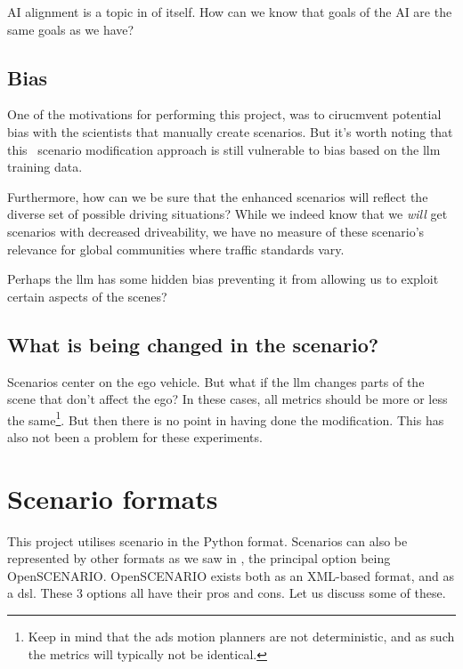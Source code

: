 AI alignment is a topic in of itself. How can we know that goals of the AI are the same goals as we
have?

\subsection{Bias}

One of the motivations for performing this project, was to cirucmvent potential bias with the
scientists that manually create scenarios. But it's worth noting that this \hefe~scenario
modification approach is still vulnerable to bias based on the \acrshort{llm} training data.

Furthermore, how can we be sure that the enhanced scenarios will reflect the diverse set of possible
driving situations? While we indeed know that we \emph{will} get scenarios with decreased
driveability, we have no measure of these scenario's relevance for global communities where traffic
standards vary.

Perhaps the \acrshort{llm} has some hidden bias preventing it from allowing us to exploit certain
aspects of the scenes?

\subsection{What is being changed in the scenario?}

Scenarios center on the ego vehicle. But what if the \acrshort{llm} changes parts of the scene that
don't affect the ego? In these cases, all metrics should be more or less the same\footnote{Keep in
    mind that the \acrshort{ads} motion planners are not deterministic, and as such the metrics will typically
    not be identical.}. But then there is no point in having done the modification. This has also not
been a problem for these experiments.

\section{Scenario formats}

This project utilises scenario in the Python format. Scenarios can also be represented by other
formats as we saw in , the principal option being OpenSCENARIO.
OpenSCENARIO exists both as an XML-based format, and as a \acrfull{dsl}. These \num{3} options all
have their pros and cons. Let us discuss some of these.

